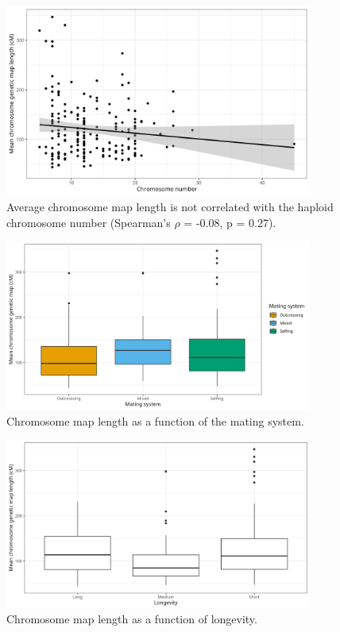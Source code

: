 \documentclass{article}
\begin{document}
\begin{figure}[h!]
  \includegraphics[width=0.9\textwidth]{figures/FigS2.jpeg}
  \centering
  \caption{Average chromosome map length is not correlated with the haploid chromosome number (Spearman’s $\rho$ = -0.08, p = 0.27).
  }
  \label{figure:FigS2}
\end{figure}


\begin{figure}[h!]
  \includegraphics[width=0.9\textwidth]{figures/FigS3.jpeg}
  \centering
  \caption{Chromosome map length as a function of the mating system.
  }
  \label{figure:FigS3}
\end{figure}


\begin{figure}[h!]
  \includegraphics[width=0.9\textwidth]{figures/FigS4.jpeg}
  \centering
  \caption{Chromosome map length as a function of longevity.
  }
  \label{figure:FigS4}
\end{figure}
\end{document}
